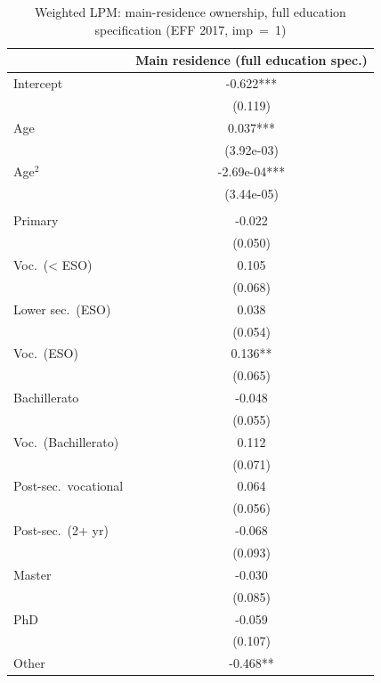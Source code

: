 \begin{table}

\caption{Weighted LPM: main-residence ownership, full education specification (EFF 2017, imp~=~1)}
\centering
\begin{tabular}[t]{lc}
\toprule
  & Main residence (full education spec.)\\
\midrule
Intercept & -0.622***\\
 & (0.119)\\
Age & 0.037***\\
 & (3.92e-03)\\
Age$^2$ & -2.69e-04***\\
 & (3.44e-05)\\
\addlinespace[0.3em]
\multicolumn{2}{l}{\textit{Education (ref.: Illiterate)}}\\
\hspace{6pt} Primary & -0.022\\
 & (0.050)\\
\hspace{6pt} Voc.\ (< ESO) & 0.105\\
 & (0.068)\\
\hspace{6pt} Lower sec.\ (ESO) & 0.038\\
 & \vphantom{2} (0.054)\\
\hspace{6pt} Voc.\ (ESO) & 0.136**\\
 & (0.065)\\
\hspace{6pt} Bachillerato & -0.048\\
 & (0.055)\\
\hspace{6pt} Voc.\ (Bachillerato) & 0.112\\
 & (0.071)\\
\hspace{6pt} Post-sec.\ vocational & 0.064\\
 & (0.056)\\
\hspace{6pt} Post-sec.\ (2+ yr) & -0.068\\
 & (0.093)\\
\hspace{6pt} Master & -0.030\\
 & (0.085)\\
\hspace{6pt} PhD & -0.059\\
 & (0.107)\\
\hspace{6pt} Other & -0.468**\\

\end{tabular}
\end{table}
